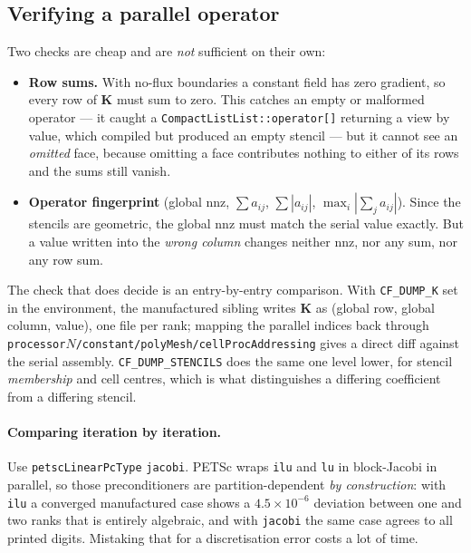 \documentclass[11pt,a4paper]{article}
\newcommand{\code}[1]{\texttt{\small #1}}
\newcommand{\Kstif}{\mathbf{K}}
\newcommand{\dictkey}[1]{\textcolor{black!60!green}{\texttt{\footnotesize #1}}}
\begin{document}
\subsection{Verifying a parallel operator}
\label{sec:dist-verif}

Two checks are cheap and are \emph{not} sufficient on their own:

\begin{itemize}
  \item \textbf{Row sums.} With no-flux boundaries a constant field has zero
        gradient, so every row of $\Kstif$ must sum to zero. This catches an
        empty or malformed operator --- it caught a
        \code{CompactListList::operator[]} returning a view by value, which
        compiled but produced an empty stencil --- but it cannot see an
        \emph{omitted} face, because omitting a face contributes nothing to
        either of its rows and the sums still vanish.
  \item \textbf{Operator fingerprint} (global nnz, $\sum a_{ij}$,
        $\sum|a_{ij}|$, $\max_i |\sum_j a_{ij}|$). Since the stencils are
        geometric, the global nnz must match the serial value exactly. But a
        value written into the \emph{wrong column} changes neither nnz, nor any
        sum, nor any row sum.
\end{itemize}

The check that does decide is an entry-by-entry comparison. With
\code{CF\_DUMP\_K} set in the environment, the manufactured sibling writes
$\Kstif$ as (global row, global column, value), one file per rank; mapping the
parallel indices back through
\code{processor$N$/constant/polyMesh/cellProcAddressing} gives a direct diff
against the serial assembly. \code{CF\_DUMP\_STENCILS} does the same one level
lower, for stencil \emph{membership} and cell centres, which is what
distinguishes a differing coefficient from a differing stencil.

\paragraph{Comparing iteration by iteration.} Use
\dictkey{petscLinearPcType} \code{jacobi}. PETSc wraps \code{ilu} and \code{lu}
in block-Jacobi in parallel, so those preconditioners are partition-dependent
\emph{by construction}: with \code{ilu} a converged manufactured case shows a
$4.5\times10^{-6}$ deviation between one and two ranks that is entirely
algebraic, and with \code{jacobi} the same case agrees to all printed digits.
Mistaking that for a discretisation error costs a lot of time.
\end{document}
